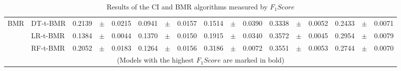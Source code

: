 {\begin{table}[!t]
{\begin{tabular}{l l r@{\hskip 0in}c@{\hskip 0in}l r@{\hskip 0in}c@{\hskip 0in}l r@{\hskip 
    0in}c@{\hskip 0in}l  r@{\hskip 0in}c@{\hskip 0in}l r@{\hskip 0in}c@{\hskip 0in}l}
\hline 
BMR&DT-t-BMR & 0.2139 &$\pm$& 0.0215 & 0.0941 &$\pm$& 0.0157 & 0.1514 &$\pm$& 0.0390 & 0.3338 &$\pm$& 0.0052 & 0.2433 &$\pm$& 0.0071\\
&LR-t-BMR & 0.1384 &$\pm$& 0.0044 & 0.1370 &$\pm$& 0.0150 & 0.1915 &$\pm$& 0.0340  &  0.3572 &$\pm$&0.0045 & 0.2954 &$\pm$& 0.0079\\
&RF-t-BMR & 0.2052 &$\pm$& 0.0183 & 0.1264 &$\pm$& 0.0156 & 0.3186 &$\pm$& 0.0072&  0.3551 &$\pm$&0.0053 & 0.2744 &$\pm$& 0.0070\\
      \hline
      \multicolumn{17}{c}{(Models with the highest $F_1Score$ are marked in bold)}
    \end{tabular}
    }
\caption{Results of the CI and BMR algorithms measured by $F_1Score$}
\label{tab:9:results_f1score}
  \end{table}


}
